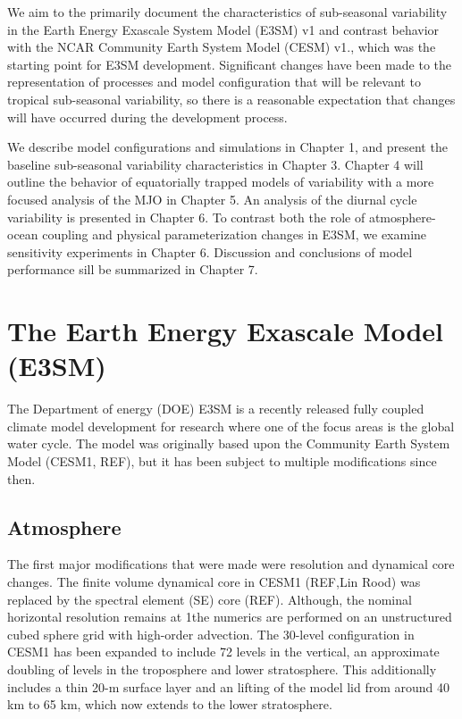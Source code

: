 \documentclass[draft,ms]{AGUTeX}
\begin{document}
\begin{article}
We aim to the primarily document the characteristics of sub-seasonal variability in the Earth Energy Exascale System Model (E3SM) v1 and contrast behavior with the NCAR Community Earth System Model (CESM) v1., which was the starting point for E3SM development. Significant changes have been made to the representation of processes and model configuration that will be relevant to tropical sub-seasonal variability, so there is a reasonable expectation that changes will have occurred during the development process.


We describe model configurations and simulations in Chapter 1, and present the baseline sub-seasonal variability characteristics in Chapter 3. Chapter 4 will outline the behavior of equatorially trapped models of variability with a more focused analysis of the MJO in Chapter 5. An analysis of the diurnal cycle variability is presented in Chapter 6. To contrast both the role of atmosphere-ocean coupling and physical parameterization changes in E3SM, we examine sensitivity experiments in Chapter 6. Discussion and conclusions of model performance sill be summarized in Chapter 7.



\section{The Earth Energy Exascale Model (E3SM)}
The Department of energy (DOE) E3SM is a recently released fully coupled climate model development for research where one of the focus areas is the global water cycle. The model was originally based upon the Community Earth System Model (CESM1, REF), but it has been subject to multiple modifications since then.
\subsection{Atmosphere}
The first major modifications that were made were resolution and dynamical core changes. The finite volume dynamical core in CESM1 (REF,Lin Rood) was replaced by the spectral element (SE) core (REF). Although, the nominal horizontal resolution remains at 1\deg the numerics are performed on an unstructured cubed sphere grid with high-order advection. The 30-level configuration in CESM1 has been expanded to include 72 levels in the vertical, an approximate doubling of levels in the troposphere and lower stratosphere. This additionally includes a thin 20-m surface layer and an lifting of the model lid from around 40 km to 65 km, which now extends to the lower stratosphere.


\end{article}
\end{document}
